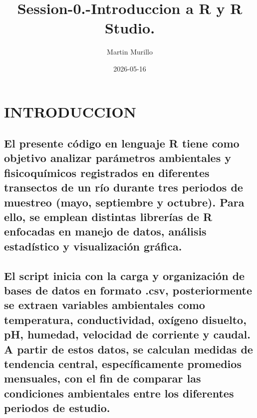\documentclass[
]{article}
\title{Session-0.-Introduccion a R y R Studio.}
\author{Martin Murillo}
\date{2026-05-16}
\begin{document}
\maketitle

\hypertarget{introduccion}{%
\section{INTRODUCCION}\label{introduccion}}

\hypertarget{el-presente-cuxf3digo-en-lenguaje-r-tiene-como-objetivo-analizar-paruxe1metros-ambientales-y-fisicoquuxedmicos-registrados-en-diferentes-transectos-de-un-ruxedo-durante-tres-periodos-de-muestreo-mayo-septiembre-y-octubre.-para-ello-se-emplean-distintas-libreruxedas-de-r-enfocadas-en-manejo-de-datos-anuxe1lisis-estaduxedstico-y-visualizaciuxf3n-gruxe1fica.}{%
\subsection{El presente código en lenguaje R tiene como objetivo
analizar parámetros ambientales y fisicoquímicos registrados en
diferentes transectos de un río durante tres periodos de muestreo (mayo,
septiembre y octubre). Para ello, se emplean distintas librerías de R
enfocadas en manejo de datos, análisis estadístico y visualización
gráfica.}\label{el-presente-cuxf3digo-en-lenguaje-r-tiene-como-objetivo-analizar-paruxe1metros-ambientales-y-fisicoquuxedmicos-registrados-en-diferentes-transectos-de-un-ruxedo-durante-tres-periodos-de-muestreo-mayo-septiembre-y-octubre.-para-ello-se-emplean-distintas-libreruxedas-de-r-enfocadas-en-manejo-de-datos-anuxe1lisis-estaduxedstico-y-visualizaciuxf3n-gruxe1fica.}}

\hypertarget{el-script-inicia-con-la-carga-y-organizaciuxf3n-de-bases-de-datos-en-formato-.csv-posteriormente-se-extraen-variables-ambientales-como-temperatura-conductividad-oxuxedgeno-disuelto-ph-humedad-velocidad-de-corriente-y-caudal.-a-partir-de-estos-datos-se-calculan-medidas-de-tendencia-central-especuxedficamente-promedios-mensuales-con-el-fin-de-comparar-las-condiciones-ambientales-entre-los-diferentes-periodos-de-estudio.}{%
\subsection{El script inicia con la carga y organización de bases de
datos en formato .csv, posteriormente se extraen variables ambientales
como temperatura, conductividad, oxígeno disuelto, pH, humedad,
velocidad de corriente y caudal. A partir de estos datos, se calculan
medidas de tendencia central, específicamente promedios mensuales, con
el fin de comparar las condiciones ambientales entre los diferentes
periodos de
estudio.}\label{el-script-inicia-con-la-carga-y-organizaciuxf3n-de-bases-de-datos-en-formato-.csv-posteriormente-se-extraen-variables-ambientales-como-temperatura-conductividad-oxuxedgeno-disuelto-ph-humedad-velocidad-de-corriente-y-caudal.-a-partir-de-estos-datos-se-calculan-medidas-de-tendencia-central-especuxedficamente-promedios-mensuales-con-el-fin-de-comparar-las-condiciones-ambientales-entre-los-diferentes-periodos-de-estudio.}}
\end{document}
